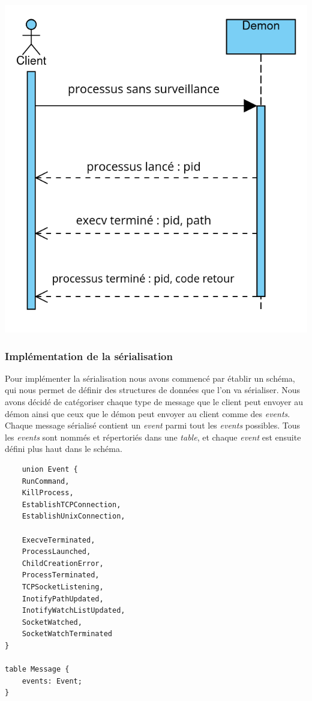 \documentclass{article}
\begin{document}
\centerline{\includegraphics[scale=0.35]{rendu/fonctionnement_normal.png}}

\subsubsection{Implémentation de la sérialisation}

Pour implémenter la sérialisation nous avons commencé par établir un schéma, qui nous permet de définir des structures de données que l'on va sérialiser.
Nous avons décidé de catégoriser chaque type de message que le client peut envoyer au démon ainsi que ceux que le démon peut envoyer au client comme des \textit{events}. Chaque message sérialisé contient un \textit{event} parmi tout les \textit{events} possibles. Tous les \textit{events} sont nommés et répertoriés dans une \textit{table}, et chaque \textit{event} est ensuite défini plus haut dans le schéma.

\begin{verbatim}
    union Event {
    RunCommand,
    KillProcess,
    EstablishTCPConnection,
    EstablishUnixConnection,

    ExecveTerminated,
    ProcessLaunched,
    ChildCreationError,
    ProcessTerminated,
    TCPSocketListening,
    InotifyPathUpdated,
    InotifyWatchListUpdated,
    SocketWatched,
    SocketWatchTerminated
}

table Message {
    events: Event;
}
\end{verbatim}
\end{document}
